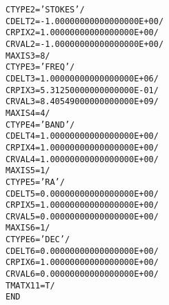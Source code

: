 \documentclass[twoside]{article}
\begin{document}
\begin{alltt}
CTYPE2  = 'STOKES  '           /
CDELT2  =  -1.00000000000000000E+00 /
CRPIX2  =   1.00000000000000000E+00 /
CRVAL2  =  -1.00000000000000000E+00 /
MAXIS3  =                    8 /
CTYPE3  = 'FREQ    '           /
CDELT3  =   1.00000000000000000E+06 /
CRPIX3  =   5.31250000000000000E-01 /
CRVAL3  =   8.40549000000000000E+09 /
MAXIS4  =                    4 /
CTYPE4  = 'BAND    '           /
CDELT4  =   1.00000000000000000E+00 /
CRPIX4  =   1.00000000000000000E+00 /
CRVAL4  =   1.00000000000000000E+00 /
MAXIS5  =                    1 /
CTYPE5  = 'RA      '           /
CDELT5  =   0.00000000000000000E+00 /
CRPIX5  =   1.00000000000000000E+00 /
CRVAL5  =   0.00000000000000000E+00 /
MAXIS6  =                    1 /
CTYPE6  = 'DEC     '           /
CDELT6  =   0.00000000000000000E+00 /
CRPIX6  =   1.00000000000000000E+00 /
CRVAL6  =   0.00000000000000000E+00 /
TMATX11 =                    T /
END
\end{alltt}
\end{document}
